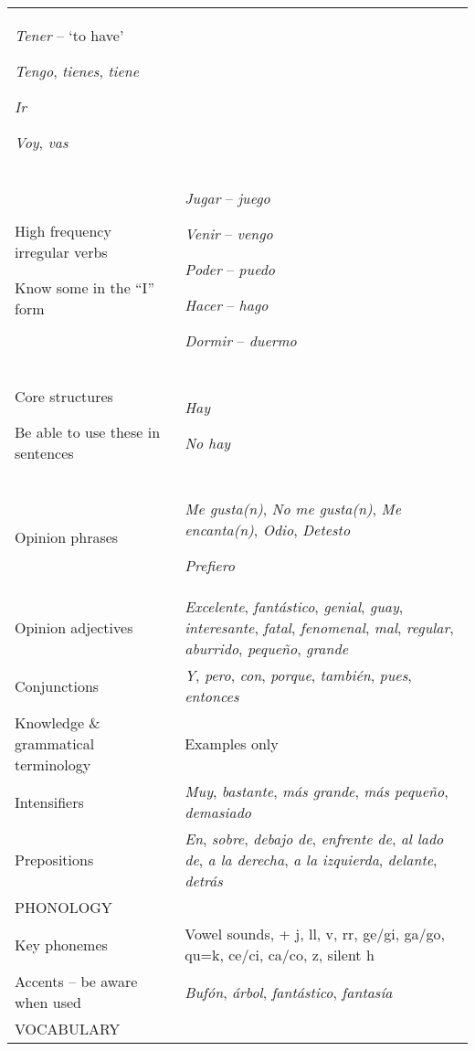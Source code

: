 \documentclass[output=paper]{langscibook}
\begin{document}
\begin{longtable}{ *2{p{}} }
\textit{Tener} -- `to have'

\textit{Tengo}, \textit{tienes}, \textit{tiene}

\textit{Ir}

\textit{Voy}, \textit{vas}\\

High frequency irregular verbs

Know some in the “I” form & \textit{Jugar} -- \textit{juego}

\textit{Venir} -- \textit{vengo}

\textit{Poder} -- \textit{puedo}

\textit{Hacer} -- \textit{hago}

\textit{Dormir} -- \textit{duermo}\\
\tablevspace
Core structures

Be able to use these in sentences & \textit{Hay}

\textit{No hay}\\
\tablevspace
Opinion phrases	& \textit{Me gusta(n)}, \textit{No me gusta(n)}, \textit{Me encanta(n)}, \textit{Odio}, \textit{Detesto}

\textit{Prefiero}\\
\tablevspace
Opinion adjectives & \textit{Excelente}, \textit{fantástico}, \textit{genial}, \textit{guay}, \textit{interesante}, \textit{fatal}, \textit{fenomenal}, \textit{mal}, \textit{regular}, \textit{aburrido}, \textit{pequeño}, \textit{grande}\\
\tablevspace
Conjunctions &	\textit{Y}, \textit{pero}, \textit{con}, \textit{porque}, \textit{también}, \textit{pues}, \textit{entonces}\\

Knowledge \& grammatical terminology &	Examples only\\
\midrule
Intensifiers &	\textit{Muy}, \textit{bastante}, \textit{más grande}, \textit{más pequeño}, \textit{demasiado}\\
\tablevspace
Prepositions &	\textit{En}, \textit{sobre}, \textit{debajo de}, \textit{enfrente de}, \textit{al lado de}, \textit{a la derecha}, \textit{a la izquierda}, \textit{delante}, \textit{detrás}\\
\midrule
PHONOLOGY	& \\
\tablevspace
Key phonemes &	Vowel sounds, + j, ll, v, rr, ge/gi, ga/go, qu=k, ce/ci, ca/co, z, silent h\\
\tablevspace
Accents -- be aware when used &	\textit{Bufón}, \textit{árbol}, \textit{fantástico}, \textit{fantasía}\\
\midrule
VOCABULARY	& \\


\end{longtable}
\end{document}
